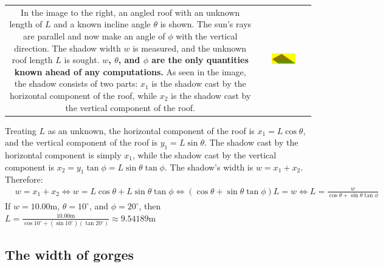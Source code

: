 \documentclass{article}
\begin{document}
\begin{tabular}{cc}
\parbox{0.5\textwidth}{
In the image to the right, an angled roof with an unknown length of \(L\) and a known incline angle \(\theta\) is shown. The sun's rays are parallel and now make an angle of \(\phi\) with the vertical direction. The shadow width \(w\) is measured, and the unknown roof length \(L\) is sought.  {\bf \(w\), \(\theta\), and \(\phi\) are the only quantities known ahead of any computations.} As seen in the image, the shadow consists of two parts: \(x_1\) is the shadow cast by the horizontal component of the roof, while \(x_2\) is the shadow cast by the vertical component of the roof. 
} & \parbox{0.5\textwidth}{
\includegraphics[width = 0.5\textwidth]{angled_roof_4}
}
\end{tabular}
Treating \(L\) as an unknown, the horizontal component of the roof is \(x_1 = L\cos\theta\), and the vertical component of the roof is \(y_1 = L\sin\theta\). The shadow cast by the horizontal component is simply \(x_1\), while the shadow cast by the vertical component is \(x_2 = y_1\tan\phi = L\sin\theta\tan\phi\). The shadow's width is \(w = x_1 + x_2\). Therefore:
\begin{align*}
& w = x_1 + x_2 
\iff w = L\cos\theta + L\sin\theta\tan\phi 
\iff (\cos\theta + \sin\theta \tan\phi)L = w 
\iff L = \frac{w}{\cos\theta + \sin\theta \tan\phi}
\end{align*} 
If \(w = 10.00\text{m}\), \(\theta = 10^\circ\), and \(\phi = 20^\circ\), then \\ \(L = \frac{10.00\text{m}}{\cos 10^\circ + (\sin 10^\circ)(\tan 20^\circ)} \approx 9.54189\text{m}\)



\subsection*{The width of gorges}
\end{document}
